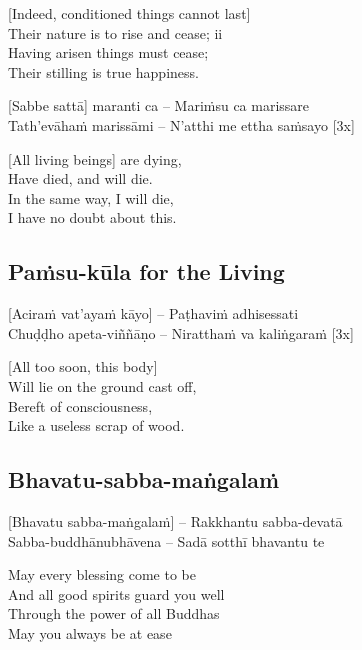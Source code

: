 \begin{english}
  [Indeed, conditioned things cannot last]\\
  Their nature is to rise and cease; ii\\
  Having arisen things must cease;\\
  Their stilling is true happiness.
\end{english}

\suttaRef{[DN 16]}

[Sabbe sattā] maranti ca – Mariṁsu ca marissare\\
Tath'evāhaṁ marissāmi – N'atthi me ettha saṁsayo \hfill{[3x]}

\begin{english}
  [All living beings] are dying,\\
  Have died, and will die.\\
  In the same way, I will die,\\
  I have no doubt about this.
\end{english}

\suttaRef{[Thai]}

\subsection{Paṁsu-kūla for the Living}
\label{pamsu-kula-living}
[Aciraṁ vat'ayaṁ kāyo] – Paṭhaviṁ adhisessati\\
Chuḍḍho apeta-viññāṇo – Niratthaṁ va kaliṅgaraṁ \hfill{[3x]}

\begin{english}
  [All too soon, this body]\\
  Will lie on the ground cast off,\\
  Bereft of consciousness,\\
  Like a useless scrap of wood.
\end{english}

\suttaRef{[Dhp 41]}

\subsection{Bhavatu-sabba-maṅgalaṁ}
\label{bhavtu}

[Bhavatu sabba-maṅgalaṁ] – Rakkhantu sabba-devatā\\
Sabba-buddhānubhāvena – Sadā sotthī bhavantu te

\begin{english}
  May every blessing come to be\\
  And all good spirits guard you well\\
  Through the power of all Buddhas\\
  May you always be at ease
\end{english}

